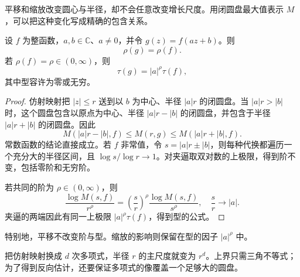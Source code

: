 \ProseParagraphBreak

平移和缩放改变圆心与半径，却不会任意改变增长尺度。用闭圆盘最大值表示 \(M\)，可以把这种变化写成精确的包含关系。

\begin{proposition}[仿射变量变换]\label{b3:prop:19-affine-growth}
设 \(f\) 为整函数，\(a,b\in\mathbb C\)、\(a\ne0\)，并令 \(g(z)=f(az+b)\)。则
\[
 \rho(g)=\rho(f).
\]
若 \(\rho(f)=\rho\in(0,\infty)\)，则
\[
 \tau(g)=|a|^\rho\tau(f),
\]
其中型容许为零或无穷。
\end{proposition}
\begin{proof}
仿射映射把 \(|z|\le r\) 送到以 \(b\) 为中心、半径 \(|a|r\) 的闭圆盘。当 \(|a|r>|b|\) 时，这个圆盘包含以原点为中心、半径 \(|a|r-|b|\) 的闭圆盘，并包含于半径 \(|a|r+|b|\) 的闭圆盘。因此
\[
 M(|a|r-|b|,f)\le M(r,g)\le M(|a|r+|b|,f).
\]
常数函数的结论直接成立。若 \(f\) 非常值，令 \(s=|a|r\pm|b|\)，则每种代换都遍历一个充分大的半径区间，且 \(\log s/\log r\to1\)。对夹逼取双对数的上极限，得到阶不变，包括零阶和无穷阶。

若共同的阶为 \(\rho\in(0,\infty)\)，则
\[
 \frac{\log M(s,f)}{r^\rho}
 =\left(\frac{s}{r}\right)^\rho
   \frac{\log M(s,f)}{s^\rho},
 \quad \frac{s}{r}\longrightarrow|a|.
\]
夹逼的两端因此有同一上极限 \(|a|^\rho\tau(f)\)，得到型的公式。
\end{proof}
特别地，平移不改变阶与型。缩放的影响则保留在型的因子 \(|a|^\rho\) 中。

\ProseParagraphBreak

把仿射映射换成 \(d\) 次多项式，半径 \(r\) 的主尺度就变为 \(r^d\)。上界只需三角不等式；为了得到反向估计，还要保证多项式的像覆盖一个足够大的圆盘。

